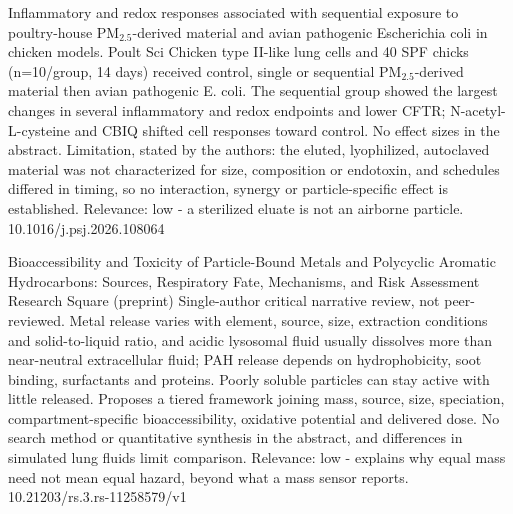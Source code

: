 \documentclass[10pt]{article}
\begin{document}
\par{}\baselineskip{}\baselineskip
{}

{Inflammatory and redox responses associated with sequential exposure to poultry-house PM$_{2.5}$-derived material and avian pathogenic Escherichia coli in chicken models.}
{Poult Sci}
{Chicken type II-like lung cells and 40 SPF chicks (n=10/group, 14 days) received control, single or sequential PM$_{2.5}$-derived material then avian pathogenic E. coli. The sequential group showed the largest changes in several inflammatory and redox endpoints and lower CFTR; N-acetyl-L-cysteine and CBIQ shifted cell responses toward control. No effect sizes in the abstract. Limitation, stated by the authors: the eluted, lyophilized, autoclaved material was not characterized for size, composition or endotoxin, and schedules differed in timing, so no interaction, synergy or particle-specific effect is established. Relevance: low - a sterilized eluate is not an airborne particle.}
{10.1016/j.psj.2026.108064}

{Bioaccessibility and Toxicity of Particle-Bound Metals and Polycyclic Aromatic Hydrocarbons: Sources, Respiratory Fate, Mechanisms, and Risk Assessment}
{Research Square (preprint)}
{Single-author critical narrative review, not peer-reviewed. Metal release varies with element, source, size, extraction conditions and solid-to-liquid ratio, and acidic lysosomal fluid usually dissolves more than near-neutral extracellular fluid; PAH release depends on hydrophobicity, soot binding, surfactants and proteins. Poorly soluble particles can stay active with little released. Proposes a tiered framework joining mass, source, size, speciation, compartment-specific bioaccessibility, oxidative potential and delivered dose. No search method or quantitative synthesis in the abstract, and differences in simulated lung fluids limit comparison. Relevance: low - explains why equal mass need not mean equal hazard, beyond what a mass sensor reports.}
{10.21203/rs.3.rs-11258579/v1}

\par{}\baselineskip{}\baselineskip
{}
\end{document}
